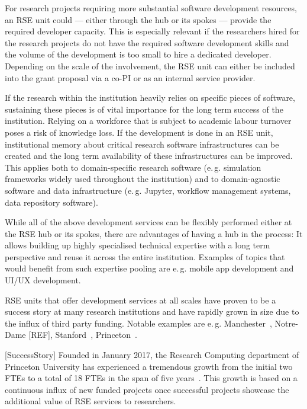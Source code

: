 \documentclass[a4paper]{article}
\makeatletter
\newcommand*{\eg}{e.\,g.\@\xspace}
\makeatother
\begin{document}
For research projects requiring more substantial software development resources, an RSE unit could --- either through the hub or its spokes --- provide the required developer capacity.
This is especially relevant if the researchers hired for the research projects do not have the required software development skills and the volume of the development is too small to hire a dedicated developer.
Depending on the scale of the involvement, the RSE unit can either be included into the grant proposal via a co-PI or as an internal service provider.

If the research within the institution heavily relies on specific pieces of software,
sustaining these pieces is of vital importance for the long term success of the institution.
Relying on a workforce that is subject to academic labour turnover poses a risk of knowledge loss.
If the development is done in an RSE unit, institutional memory about critical research software infrastructures can be created and the long term availability of these infrastructures can be improved.
This applies both to domain-specific research software (\eg{} simulation frameworks widely used throughout the institution)
and to domain-agnostic software and data infrastructure (\eg{} Jupyter, workflow management systems, data repository software).

While all of the above development services can be flexibly performed either at the RSE hub or its spokes, there are advantages of having a hub in the process:
It allows building up highly specialised technical expertise with a long term perspective and reuse it across the entire institution.
Examples of topics that would benefit from such expertise pooling are \eg{} mobile app development and UI/UX development.

RSE units that offer development services at all scales have proven to be a success story at many research institutions and have rapidly grown in size due to the influx of third party funding.
Notable examples are \eg{} Manchester~\autocite{Sinclair2022}, Notre-Dame [REF], Stanford~\autocite{Stanford2023}, Princeton~\autocite{Cosden2022a}.

[SuccessStory]
Founded in January 2017, the Research Computing department of Princeton University has experienced a tremendous growth from the initial two FTEs to a total of 18 FTEs in the span of five years~\autocite{Cosden2022a}.
This growth is based on a continuous influx of new funded projects once successful projects showcase the additional value of RSE services to researchers.
\end{document}
